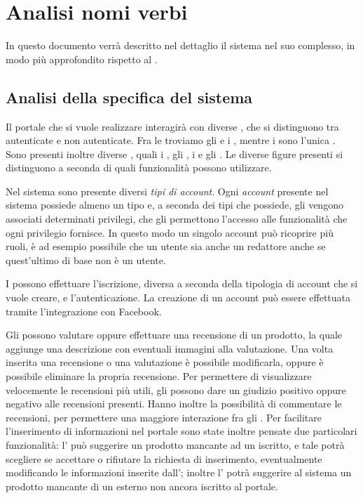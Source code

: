 \section{Analisi nomi verbi} 
\jsognrepu In questo documento verrà descritto nel dettaglio il sistema nel suo complesso, in modo più approfondito rispetto al .

\subsection{Analisi della specifica del sistema} 
Il portale che si vuole realizzare interagirà con diverse , che si distinguono tra autenticate e non autenticate. Fra le  troviamo gli  e i , mentre i  sono l'unica .
Sono presenti inoltre diverse , quali i , gli , i  e gli .
Le diverse figure presenti si distinguono a seconda di quali funzionalità possono utilizzare. 

\bigskip
\noindent
Nel sistema sono presente diversi \emph{tipi di account}.
Ogni \emph{account} presente nel sistema possiede almeno un tipo e, a seconda dei tipi che possiede, gli vengono associati determinati privilegi, che gli permettono l'accesso alle funzionalità che ogni privilegio fornisce. In questo modo un singolo account può ricoprire più ruoli, è ad esempio possibile che un utente sia anche un redattore anche se quest'ultimo di base non è un utente.

I  possono effettuare l'iscrizione, diversa a seconda della tipologia di account che si vuole creare, e l'autenticazione. La creazione di un account  può essere effettuata tramite l'integrazione con Facebook.

Gli  possono valutare oppure effettuare una recensione di un prodotto, la quale aggiunge una descrizione con eventuali immagini alla valutazione. Una volta inserita una recensione o una valutazione è possibile modificarla, oppure è possibile eliminare la propria recensione. 
Per permettere di visualizzare velocemente le recensioni più utili, gli  possono dare un giudizio positivo oppure negativo alle recensioni presenti. Hanno inoltre la possibilità di commentare le recensioni, per permettere una maggiore interazione fra gli .
Per facilitare l'inserimento di informazioni nel portale sono state inoltre pensate due particolari funzionalità: l' può suggerire un prodotto mancante ad un  iscritto, e tale  potrà scegliere se accettare o rifiutare la richiesta di inserimento, eventualmente modificando le informazioni inserite dall'; inoltre l' potrà suggerire al sistema un prodotto mancante di un  esterno non ancora iscritto al portale.

